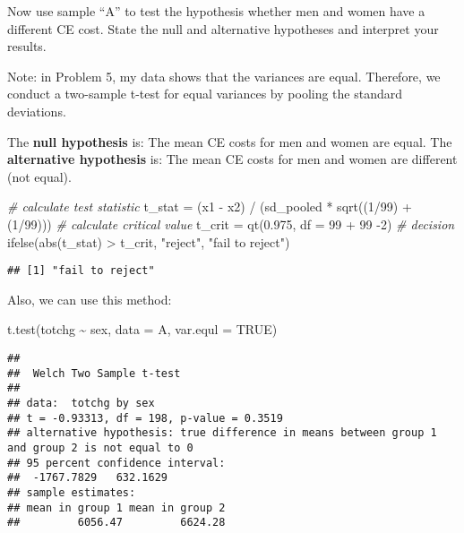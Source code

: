 \documentclass[
]{article}
\newenvironment{Shaded}{\begin{snugshade}}{\end{snugshade}}
\newcommand{\AttributeTok}[1]{\textcolor[rgb]{0.77,0.63,0.00}{#1}}
\newcommand{\CommentTok}[1]{\textcolor[rgb]{0.56,0.35,0.01}{\textit{#1}}}
\newcommand{\ConstantTok}[1]{\textcolor[rgb]{0.00,0.00,0.00}{#1}}
\newcommand{\DecValTok}[1]{\textcolor[rgb]{0.00,0.00,0.81}{#1}}
\newcommand{\FloatTok}[1]{\textcolor[rgb]{0.00,0.00,0.81}{#1}}
\newcommand{\FunctionTok}[1]{\textcolor[rgb]{0.00,0.00,0.00}{#1}}
\newcommand{\NormalTok}[1]{#1}
\newcommand{\OtherTok}[1]{\textcolor[rgb]{0.56,0.35,0.01}{#1}}
\newcommand{\SpecialCharTok}[1]{\textcolor[rgb]{0.00,0.00,0.00}{#1}}
\newcommand{\StringTok}[1]{\textcolor[rgb]{0.31,0.60,0.02}{#1}}
\begin{document}
Now use sample ``A'' to test the hypothesis whether men and women have a
different CE cost. State the null and alternative hypotheses and
interpret your results.

Note: in Problem 5, my data shows that the variances are equal.
Therefore, we conduct a two-sample t-test for equal variances by pooling
the standard deviations.

The \textbf{null hypothesis} is: The mean CE costs for men and women are
equal. The \textbf{alternative hypothesis} is: The mean CE costs for men
and women are different (not equal).

\begin{Shaded}
\begin{Highlighting}[]
\CommentTok{\# calculate test statistic}
\NormalTok{t\_stat }\OtherTok{=}\NormalTok{ (x1 }\SpecialCharTok{{-}}\NormalTok{ x2) }\SpecialCharTok{/}\NormalTok{ (sd\_pooled }\SpecialCharTok{*} \FunctionTok{sqrt}\NormalTok{((}\DecValTok{1}\SpecialCharTok{/}\DecValTok{99}\NormalTok{) }\SpecialCharTok{+}\NormalTok{ (}\DecValTok{1}\SpecialCharTok{/}\DecValTok{99}\NormalTok{)))}
\CommentTok{\# calculate critical value}
\NormalTok{t\_crit }\OtherTok{=} \FunctionTok{qt}\NormalTok{(}\FloatTok{0.975}\NormalTok{, }\AttributeTok{df =} \DecValTok{99} \SpecialCharTok{+} \DecValTok{99} \SpecialCharTok{{-}}\DecValTok{2}\NormalTok{)}
\CommentTok{\# decision}
\FunctionTok{ifelse}\NormalTok{(}\FunctionTok{abs}\NormalTok{(t\_stat) }\SpecialCharTok{\textgreater{}}\NormalTok{ t\_crit, }\StringTok{"reject"}\NormalTok{, }\StringTok{"fail to reject"}\NormalTok{)}
\end{Highlighting}
\end{Shaded}

\begin{verbatim}
## [1] "fail to reject"
\end{verbatim}

Also, we can use this method:

\begin{Shaded}
\begin{Highlighting}[]
\FunctionTok{t.test}\NormalTok{(totchg }\SpecialCharTok{\textasciitilde{}}\NormalTok{ sex, }\AttributeTok{data =}\NormalTok{ A, }\AttributeTok{var.equl =} \ConstantTok{TRUE}\NormalTok{)}
\end{Highlighting}
\end{Shaded}

\begin{verbatim}
## 
##  Welch Two Sample t-test
## 
## data:  totchg by sex
## t = -0.93313, df = 198, p-value = 0.3519
## alternative hypothesis: true difference in means between group 1 and group 2 is not equal to 0
## 95 percent confidence interval:
##  -1767.7829   632.1629
## sample estimates:
## mean in group 1 mean in group 2 
##         6056.47         6624.28
\end{verbatim}
\end{document}
